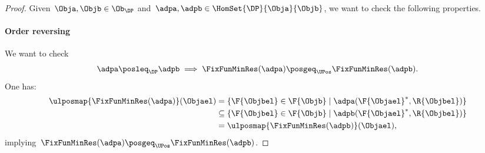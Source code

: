 \begin{proof}
    Given~$\Obja,\Objb \in \Ob_\DP$ and~$\adpa,\adpb \in \HomSet{\DP}{\Obja}{\Objb}$, we want to check the following properties.
    \paragraph*{Order reversing}
    We want to check
    \begin{equation*}
        \adpa \posleq_\DP \adpb \implies \FixFunMinRes(\adpa) \posgeq_\UPos \FixFunMinRes(\adpb).
    \end{equation*}
    One has:
    \begin{equation*}
        \begin{aligned}
        \ulposmap{\FixFunMinRes(\adpa)}(\Objael)&=\{\F{\Objbel} \in \F{\Objb} \mid \adpa(\F{\Objael}^*, \R{\Objbel})\}\\
            &\subseteq \{\F{\Objbel} \in \F{\Objb} \mid \adpb(\F{\Objael}^*, \R{\Objbel})\}\\
            &= \ulposmap{\FixFunMinRes(\adpb)}(\Objael),
        \end{aligned}
    \end{equation*}
    implying~$\FixFunMinRes(\adpa) \posgeq_\UPos \FixFunMinRes(\adpb)$.

\end{proof}
